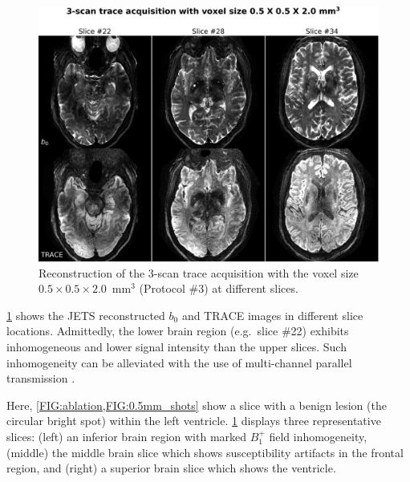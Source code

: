 \documentclass[preprint,12pt,authoryear,review]{elsarticle}
\begin{document}
    \begin{figure}
        \centering
        \includegraphics[width=\textwidth]{../figures/fig8.png}
        \caption{Reconstruction of the 3-scan trace acquisition with
        the voxel size $0.5\times0.5\times2.0$~mm$^3$ (Protocol \#3)
        at different slices.}
        \label{FIG:0.5mm_slice}
    \end{figure}

    \cref{FIG:0.5mm_slice} shows the JETS reconstructed $b_0$
    and TRACE images in different slice locations.
    Admittedly, the lower brain region (e.g.~slice \#22)
    exhibits inhomogeneous and lower signal intensity
    than the upper slices.
    Such inhomogeneity can be alleviated with
    the use of multi-channel parallel transmission
    \citep{katscher_2003_ptx,grissom_2010_ptx}.

    Here, \cref{FIG:ablation,FIG:0.5mm_shots}
    show a slice with a benign lesion
    (the circular bright spot) within the left ventricle.
    \cref{FIG:0.5mm_slice} displays three representative slices:
    (left) an inferior brain region with marked
    $B_1^+$ field inhomogeneity,
    (middle) the middle brain slice
    which shows susceptibility artifacts in the frontal region,
    and (right) a superior brain slice which shows the ventricle.
\end{document}
